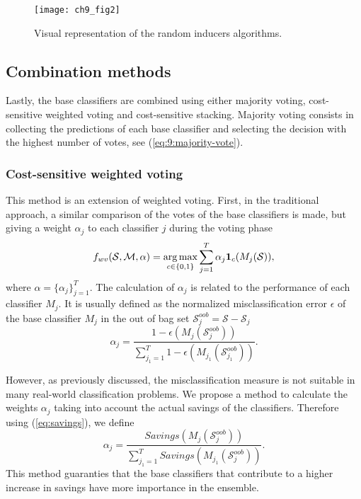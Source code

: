 {\begin{figure}[t!]
\texttt{[image: ch9\_fig2]}
\caption{Visual representation of the random inducers algorithms.}
\label{fig:9:2}
\end{figure} 


\subsection{Combination methods}

Lastly, the base classifiers are combined using either majority voting, cost-sensitive weighted 
voting and cost-sensitive stacking. Majority voting consists in collecting the predictions of 
each base classifier and selecting the decision with the highest number of votes, see 
(\ref{eq:9:majority-vote}).

\subsubsection{Cost-sensitive weighted voting}

This method is an extension of weighted voting. First, in the traditional approach, a 
similar comparison of the votes of the base classifiers is made, but giving a weight $\alpha_j$ 
to each classifier $j$ during the voting phase \citep{Zhou2012}
\begin{align} \label{eq:9:weighted-majority-vote}
  f_{wv}(\mathcal{S},\mathcal{M}, \alpha)
  =\operatorname*{arg\,max}_{c \in \{0,1\}} \sum_{j=1}^T \alpha_j \mathbf{1}_c(M_j(\mathcal{S})),
\end{align}
where $\alpha=\{\alpha_j\}_{j=1}^T$.
The calculation of $\alpha_j$ is related to the performance of each classifier $M_j$.
It is usually defined as the normalized misclassification error   $\epsilon$ of the base 
classifier $M_j$  in the out of bag set   $\mathcal{S}_j^{oob}=\mathcal{S}-\mathcal{S}_j$
\begin{equation}
  \alpha_j=\frac{1-\epsilon(M_j(\mathcal{S}_j^{oob}))}{\sum_{j_1=1}^T 
  1-\epsilon(M_{j_1}(\mathcal{S}_{j_1}^{oob}))}.
\end{equation}

However, as previously discussed, the misclassification measure is not suitable in  many 
real-world classification problems. We propose a method to calculate the weights $\alpha_j$  taking 
into account the actual savings of the classifiers. Therefore using (\ref{eq:savings}), we define
\begin{equation}
  \alpha_j=\frac{Savings(M_j(\mathcal{S}_j^{oob}))}
  {\sum_{j_1=1}^T Savings(M_{j_1}(\mathcal{S}_j^{oob}))}.
\end{equation}
This method guaranties that the base classifiers that contribute to a higher increase in savings 
have more importance in the ensemble.

}

